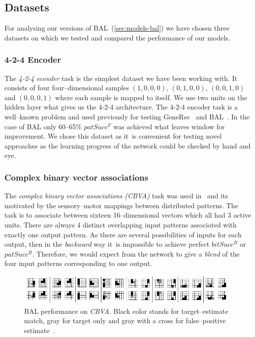 
\subsection{Datasets}  
\label{sec:sim-data} 

For analysing our versions of BAL~(\ref{sec:models-bal}) we have chosen three datasets on which we tested and compared the performance of our models. 

\subsubsection{4-2-4 Encoder} 
\label{sec:datasets-auto4}


The \emph{4-2-4 econder} task is the simplest dataset we have been working with. It consists of four four--dimensional samples $(1,0,0,0)$, $(0,1,0,0)$, $(0,0,1,0)$ and $(0,0,0,1)$ where each sample is mapped to itself. We use two units on the hidden layer what gives us the 4-2-4 architecture. The 4-2-4 encoder task is a well--known problem and used previously for testing GeneRec~\citep{o1996bio} and BAL~\citep{farkas2013bal}. In the case of BAL only 60--65\% $patSucc^F$ was achieved what leaves window for improvement. We chose this dataset as it~is convenient for testing novel approaches as the learning progress of the network could be checked by hand and eye. 

\subsubsection{Complex binary vector associations} 
\label{sec:datasets-k3}

The \emph{complex binary vector associations (CBVA)} task was used in~\citet{farkas2013bal} and its motivated by the sensory--motor mappings between distributed patterns. The task is to associate between sixteen 16--dimensional vectors which all had 3 active units. There are always 4 distinct overlapping input patterns associated with exactly one output pattern. As there are several possibilities of inputs for each output, then in the \emph{backward} way it~is impossible to achieve perfect $bitSucc^B$ or $patSucc^B$. Therefore, we would expect from the network to give a \emph{blend} of the four input patterns corresponding to one output. 

\begin{figure}[H]
  \centering
  \includegraphics[width=0.98\textwidth]{img/datasets-k3.png} 
  \caption{BAL performance on \emph{CBVA}. Black color stands for target--estimate match, gray for target only and gray with a cross for false--positive estimate~\citep{farkas2013bal}.}
  \label{fig:datasets-k3}
\end{figure}


